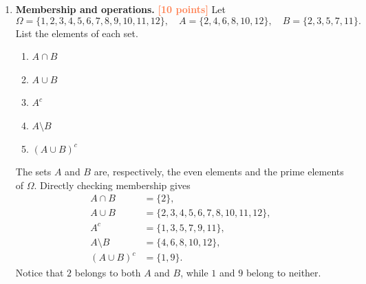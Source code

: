 \documentclass[11pt]{article}
\newcommand{\points}[1]{\hfill\textcolor{coral}{\small\bfseries[#1 points]}}
\begin{document}
\begin{enumerate}
\item \textbf{Membership and operations.} \points{10}
Let
\[
  \Omega=\{1,2,3,4,5,6,7,8,9,10,11,12\},\quad
  A=\{2,4,6,8,10,12\},\quad
  B=\{2,3,5,7,11\}.
\]
List the elements of each set.
\begin{enumerate}
  \item $A\cap B$
  \item $A\cup B$
  \item $A^c$
  \item $A\setminus B$
  \item $(A\cup B)^c$
\end{enumerate}
\begin{solution}
The sets $A$ and $B$ are, respectively, the even elements and the prime
elements of $\Omega$. Directly checking membership gives
\begin{align*}
 A\cap B&=\{2\},\\
 A\cup B&=\{2,3,4,5,6,7,8,10,11,12\},\\
 A^c&=\{1,3,5,7,9,11\},\\
 A\setminus B&=\{4,6,8,10,12\},\\
 (A\cup B)^c&=\{1,9\}.
\end{align*}
Notice that $2$ belongs to both $A$ and $B$, while $1$ and $9$ belong to
neither.
\end{solution}


\end{enumerate}
\end{document}
